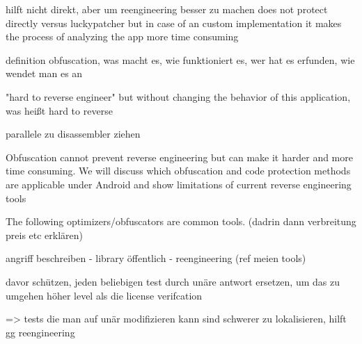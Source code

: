 hilft nicht direkt, aber um reengineering besser zu machen
does not protect directly versus luckypatcher but in case of an custom implementation it makes the process of analyzing the app more time consuming

definition obfuscation, was macht es, wie funktioniert es, wer hat es erfunden, wie wendet man es an\newline

"hard to reverse engineer" but without changing the behavior of this
application, was heißt hard to reverse\newline

parallele zu disassembler ziehen\newline

Obfuscation cannot prevent reverse engineering but can make it harder and more time consuming. We will discuss which obfuscation and code protection methods are applicable under Android and show limitations of current reverse engineering tools\newline

The following optimizers/obfuscators are common tools. (dadrin dann verbreitung preis etc erklären)





angriff beschreiben
- library öffentlich
- reengineering (ref meien tools)

davor schützen, jeden beliebigen test durch unäre antwort ersetzen, um das zu umgehen höher level als die license verifcation

=> tests die man auf unär modifizieren kann sind schwerer zu lokalisieren, hilft gg reengineering
